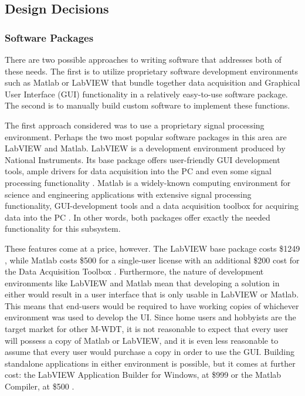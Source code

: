\subsection[Design Decisions]{Design Decisions}
\subsubsection[Software Packages]{Software Packages}
There are two possible approaches to writing software that addresses both of 
these needs. The first is to utilize proprietary software development 
environments such as Matlab or LabVIEW that bundle together data acquisition 
and Graphical User Interface (GUI) functionality in a relatively easy-to-use 
software package. The second is to manually build custom software to implement 
these functions.

The first approach considered was to use a proprietary signal processing 
environment. Perhaps the two most popular software packages in this area are 
LabVIEW and Matlab. LabVIEW is a development environment produced by National 
Instruments. Its base package offers user-friendly GUI development tools, ample 
drivers for data acquisition into the PC and even some signal processing 
functionality \cite{web:labviewbase}. Matlab is a widely-known computing 
environment for science and engineering applications with extensive signal 
processing functionality, GUI-development tools and a data acquisition toolbox 
for acquiring data into the PC \cite{web:matlab}. In other words, both packages 
offer exactly the needed functionality for this subsystem.

These features come at a price, however. The LabVIEW base package costs 
\$1249 \cite{web:labviewbase}, while Matlab costs \$500 for a single-user license with an 
additional \$200 cost for the Data Acquisition Toolbox \cite{web:matlab}\cite{web:matlabdaq}. 
Furthermore, the nature of development environments like LabVIEW and Matlab mean that 
developing a solution in either would result in a user interface that is only usable in 
LabVIEW or Matlab. This means that end-users would be required to have working 
copies of whichever environment was used to develop the UI. Since home users and 
hobbyists are the target market for other M-WDT, it is not reasonable 
to expect that every user will possess a copy of Matlab or LabVIEW, and it is even less 
reasonable to assume that every user would purchase a copy in order to use the 
GUI. Building standalone applications in either environment is possible, but it 
comes at further cost: the LabVIEW Application Builder for Windows, at \$999 \cite{web:labviewbase} 
or the Matlab Compiler, at \$500 \cite{web:matlabcompiler}. 

